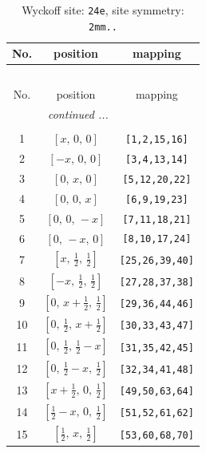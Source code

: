 \documentclass[fleqn,8pt]{jsarticle}
\begin{document}
\begin{longtable}{ccc}
\caption{Wyckoff site: {\tt 24e}, site symmetry: {\tt 2mm..}}
 \\
 \hline \hline
No. & position & mapping \\ \hline \endfirsthead

\multicolumn{2}{l}{\tablename\ \thetable{}} \\
 \hline \hline
No. & position & mapping \\ \hline \endhead

 \hline \hline
\multicolumn{2}{r}{\footnotesize\it continued ...} \\ \endfoot

 \hline \hline
\multicolumn{2}{r}{} \\ \endlastfoot

1 & $\left[ x,\, 0,\, 0 \right]$ & {\tt [1,2,15,16]} \\ \hline
2 & $\left[ - x,\, 0,\, 0 \right]$ & {\tt [3,4,13,14]} \\ \hline
3 & $\left[ 0,\, x,\, 0 \right]$ & {\tt [5,12,20,22]} \\ \hline
4 & $\left[ 0,\, 0,\, x \right]$ & {\tt [6,9,19,23]} \\ \hline
5 & $\left[ 0,\, 0,\, - x \right]$ & {\tt [7,11,18,21]} \\ \hline
6 & $\left[ 0,\, - x,\, 0 \right]$ & {\tt [8,10,17,24]} \\ \hline
7 & $\left[ x,\, \frac{1}{2},\, \frac{1}{2} \right]$ & {\tt [25,26,39,40]} \\ \hline
8 & $\left[ - x,\, \frac{1}{2},\, \frac{1}{2} \right]$ & {\tt [27,28,37,38]} \\ \hline
9 & $\left[ 0,\, x + \frac{1}{2},\, \frac{1}{2} \right]$ & {\tt [29,36,44,46]} \\ \hline
10 & $\left[ 0,\, \frac{1}{2},\, x + \frac{1}{2} \right]$ & {\tt [30,33,43,47]} \\ \hline
11 & $\left[ 0,\, \frac{1}{2},\, \frac{1}{2} - x \right]$ & {\tt [31,35,42,45]} \\ \hline
12 & $\left[ 0,\, \frac{1}{2} - x,\, \frac{1}{2} \right]$ & {\tt [32,34,41,48]} \\ \hline
13 & $\left[ x + \frac{1}{2},\, 0,\, \frac{1}{2} \right]$ & {\tt [49,50,63,64]} \\ \hline
14 & $\left[ \frac{1}{2} - x,\, 0,\, \frac{1}{2} \right]$ & {\tt [51,52,61,62]} \\ \hline
15 & $\left[ \frac{1}{2},\, x,\, \frac{1}{2} \right]$ & {\tt [53,60,68,70]} \\ \hline

\end{longtable}
\end{document}
